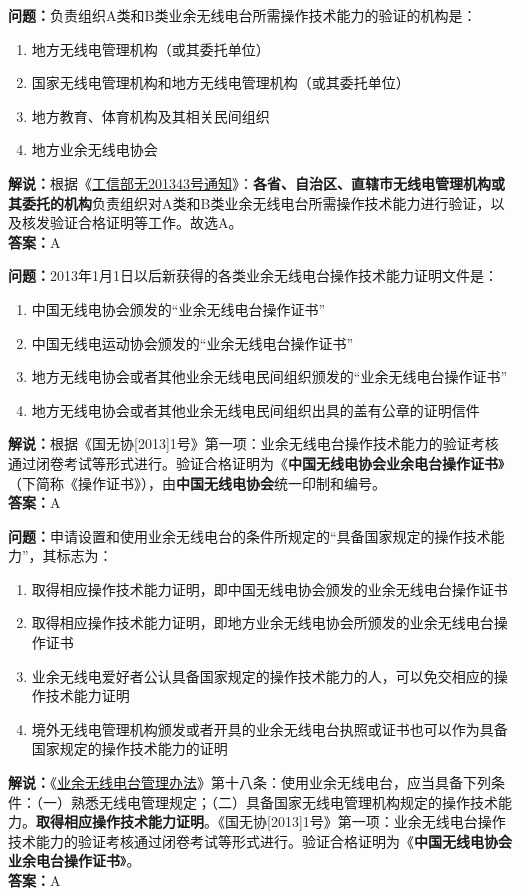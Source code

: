 \textbf{问题：}负责组织A类和B类业余无线电台所需操作技术能力的验证的机构是：
\begin{enumerate}[label=\Alph*), leftmargin=1cm]
	\item 地方无线电管理机构（或其委托单位）
	\item 国家无线电管理机构和地方无线电管理机构（或其委托单位）
	\item 地方教育、体育机构及其相关民间组织
	\item 地方业余无线电协会
\end{enumerate}
\textbf{解说：}根据《\href{http://www.crac.org.cn/wp-content/uploads/2013/02/%E5%B7%A5%E4%BF%A1%E9%83%A8%E6%97%A0201343%E5%8F%B7.pdf}{工信部无201343号通知}》：\textbf{各省、自治区、直辖市无线电管理机构或其委托的机构}负责组织对A类和B类业余无线电台所需操作技术能力进行验证，以及核发验证合格证明等工作。故选A。\\\textbf{答案：}A

\textbf{问题：}2013年1月1日以后新获得的各类业余无线电台操作技术能力证明文件是：
\begin{enumerate}[label=\Alph*), leftmargin=1cm]
	\item 中国无线电协会颁发的“业余无线电台操作证书”
	\item 中国无线电运动协会颁发的“业余无线电台操作证书”
	\item 地方无线电协会或者其他业余无线电民间组织颁发的“业余无线电台操作证书”
	\item 地方无线电协会或者其他业余无线电民间组织出具的盖有公章的证明信件
\end{enumerate}
\textbf{解说：}根据《国无协[2013]1号》第一项：业余无线电台操作技术能力的验证考核通过闭卷考试等形式进行。验证合格证明为《\textbf{中国无线电协会业余电台操作证书}》（下简称《操作证书》），由\textbf{中国无线电协会}统一印制和编号。\\\textbf{答案：}A

\textbf{问题：}申请设置和使用业余无线电台的条件所规定的“具备国家规定的操作技术能力”，其标志为：
\begin{enumerate}[label=\Alph*), leftmargin=1cm]
	\item 取得相应操作技术能力证明，即中国无线电协会颁发的业余无线电台操作证书
	\item 取得相应操作技术能力证明，即地方业余无线电协会所颁发的业余无线电台操作证书
	\item 业余无线电爱好者公认具备国家规定的操作技术能力的人，可以免交相应的操作技术能力证明
	\item 境外无线电管理机构颁发或者开具的业余无线电台执照或证书也可以作为具备国家规定的操作技术能力的证明
\end{enumerate}
\textbf{解说：}《\href{https://www.miit.gov.cn/jgsj/zfs/bmgz/art/2020/art_147b69815b3641caad9047735f94c860.html}{业余无线电台管理办法}》第十八条：使用业余无线电台，应当具备下列条件：（一）熟悉无线电管理规定；（二）具备国家无线电管理机构规定的操作技术能力。\textbf{取得相应操作技术能力证明}。《国无协[2013]1号》第一项：业余无线电台操作技术能力的验证考核通过闭卷考试等形式进行。验证合格证明为《\textbf{中国无线电协会业余电台操作证书}》。\\\textbf{答案：}A

